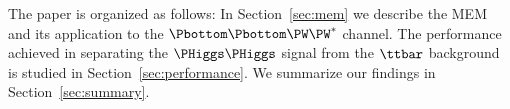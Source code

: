 The paper is organized as follows:
In Section~\ref{sec:mem} we describe the MEM and its application to the $\Pbottom\Pbottom\PW\PW^{*}$ channel.
The performance achieved in separating the $\PHiggs\PHiggs$ signal from the $\ttbar$ background is studied in Section~\ref{sec:performance}.
We summarize our findings in Section~\ref{sec:summary}.
